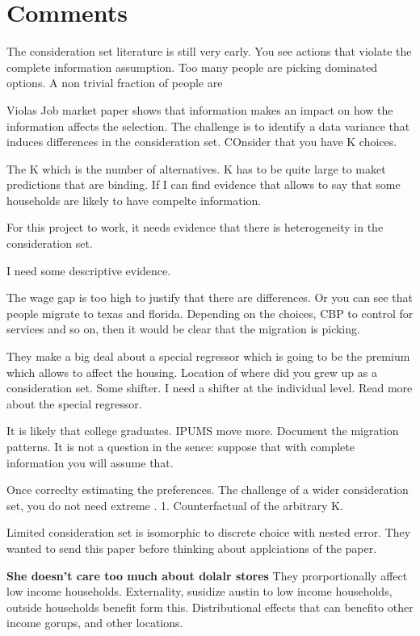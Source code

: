 \documentclass[11pt]{article}
\begin{document}
\section{Comments}

The consideration set literature is still very early. You see actions that violate the complete information assumption. Too many people are picking dominated options. A non trivial fraction of people are 

Violas Job market paper shows that information makes an impact on how the information affects the selection. The challenge is to identify a data variance that induces differences in the consideration set. COnsider that you have K choices.

The K which is the number of alternatives. K has to be quite large to maket predictions that are binding. If I can find evidence that allows to say that some households are likely to have compelte information.

For this project to work, it needs evidence that there is heterogeneity in the consideration set. 

I need some descriptive evidence. 

The wage gap is too high to justify that there are differences. Or you can see that people migrate to texas and florida. Depending on the choices, CBP to control for services and so on, then it would be clear that the migration is picking. 

They make a big deal about a special regressor which is going to be the premium which allows to affect the housing. Location of where did you grew up as a consideration set. Some shifter. I need a shifter at the individual level. Read more about the special regressor. 

It is likely that college graduates. IPUMS move more. Document the migration patterns. It is not a question in the sence: suppose that with complete information you will assume that.

Once correclty estimating the preferences. The challenge of a wider consideration set, you do not need extreme .
1. Counterfactual of the arbitrary K. 

Limited consideration set is isomorphic to discrete choice with nested error. They wanted to send this paper before thinking about applciations of the paper. 



\textbf{She doesn't care too much about dolalr stores}
They prorportionally affect low income households. Externality, susidize austin to low income households, outside households benefit form this. Distributional effects that can benefito other income gorups, and other locations. 
\end{document}
